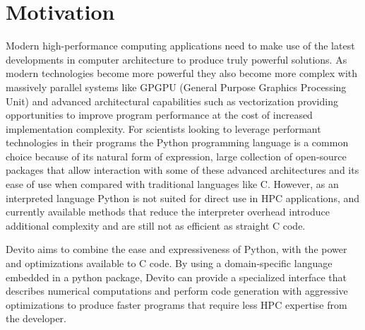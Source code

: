 \documentclass[a4paper,12pt,twoside]{report}
\begin{document}
\section*{Motivation}
Modern high-performance computing applications need to make use of the latest developments in computer architecture to produce truly
powerful solutions. As modern technologies become more powerful they also become more complex with massively parallel systems like
GPGPU (General Purpose Graphics Processing Unit) and advanced architectural capabilities such as vectorization providing opportunities
to improve program performance at the cost of increased implementation complexity. For scientists looking to leverage performant
technologies in their programs the Python programming language is a common choice because of its natural form of expression,
large collection of open-source packages that allow interaction with some of these advanced architectures and its ease of use when compared with traditional languages like C.
However, as an interpreted language Python is not suited for direct use in HPC applications, and currently available methods that reduce the interpreter overhead introduce
additional complexity and are still not as efficient as straight C code. 

Devito aims to combine the ease and expressiveness of Python, with the 
power and optimizations available to C code. By using a domain-specific language embedded in a python package, Devito can provide a specialized interface
that describes numerical computations and perform code generation with aggressive optimizations to produce faster programs that require less HPC expertise
from the developer.
\end{document}

